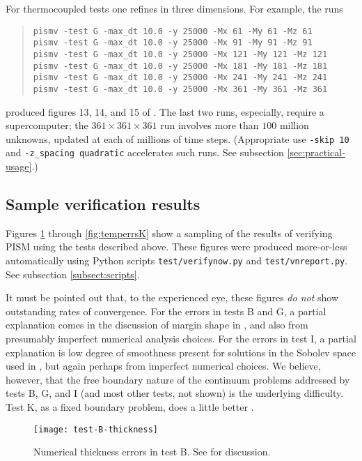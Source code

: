 For thermocoupled tests one refines in three dimensions.  For example, the runs
\begin{quote}\small
\begin{verbatim}
pismv -test G -max_dt 10.0 -y 25000 -Mx 61 -My 61 -Mz 61
pismv -test G -max_dt 10.0 -y 25000 -Mx 91 -My 91 -Mz 91
pismv -test G -max_dt 10.0 -y 25000 -Mx 121 -My 121 -Mz 121
pismv -test G -max_dt 10.0 -y 25000 -Mx 181 -My 181 -Mz 181
pismv -test G -max_dt 10.0 -y 25000 -Mx 241 -My 241 -Mz 241
pismv -test G -max_dt 10.0 -y 25000 -Mx 361 -My 361 -Mz 361
\end{verbatim}
\normalsize\end{quote}
produced figures 13, 14, and 15 of \cite{BBL}.  The last two runs, especially, require a supercomputer; the $361\times 361\times 361$ run involves more than $100$ million unknowns, updated at each of millions of time steps.  (Appropriate use \verb|-skip 10| and \verb|-z_spacing quadratic| accelerates such runs.  See subsection \ref{sec:practical-usage}.)

\subsection{Sample verification results}  Figures \ref{fig:thickerrsB} through \ref{fig:temperrsK} show a sampling of the results of verifying PISM using the tests described above.  These figures were produced more-or-less automatically using Python scripts \verb|test/verifynow.py| and \verb|test/vnreport.py|.  See subsection \ref{subsect:scripts}.

It must be pointed out that, to the experienced eye, these figures \emph{do not} show outstanding rates of convergence.  For the errors in tests B and G, a partial explanation comes in the discussion of margin shape in \cite{BLKCB}, and also from presumably imperfect numerical analysis choices.  For the errors in test I, a partial explanation is low degree of smoothness present for solutions in the Sobolev space used in \cite{SchoofStream}, but again perhaps from imperfect numerical choices.  We believe, however, that the free boundary nature of the continuum problems addressed by tests B, G, and I (and most other tests, not shown) is the underlying difficulty.  Test K, as a fixed boundary problem, does a little better \cite{BuelerTestK}.

\begin{figure}[ht]
\centering
\texttt{[image: test-B-thickness]}
\caption{Numerical thickness errors in test B. See \cite{BLKCB} for discussion.}
\label{fig:thickerrsB}
\end{figure}

